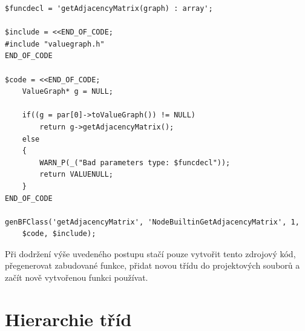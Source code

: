 \documentclass[11pt,twoside,a4paper]{book}
\begin{document}
\begin{verbatim}
$funcdecl = 'getAdjacencyMatrix(graph) : array';

$include = <<END_OF_CODE;
#include "valuegraph.h"
END_OF_CODE

$code = <<END_OF_CODE;
    ValueGraph* g = NULL;

    if((g = par[0]->toValueGraph()) != NULL)
        return g->getAdjacencyMatrix();
    else
    {
        WARN_P(_("Bad parameters type: $funcdecl"));
        return VALUENULL;
    }
END_OF_CODE

genBFClass('getAdjacencyMatrix', 'NodeBuiltinGetAdjacencyMatrix', 1,
    $code, $include);
\end{verbatim}

Při dodržení výše uvedeného postupu stačí pouze vytvořit tento zdrojový kód, přegenerovat zabudované funkce, přidat novou třídu do projektových souborů a začít nově vytvořenou funkci používat.



\twocolumn

\chapter{Hierarchie tříd}
\label{hierarchie_trid}
\end{document}
